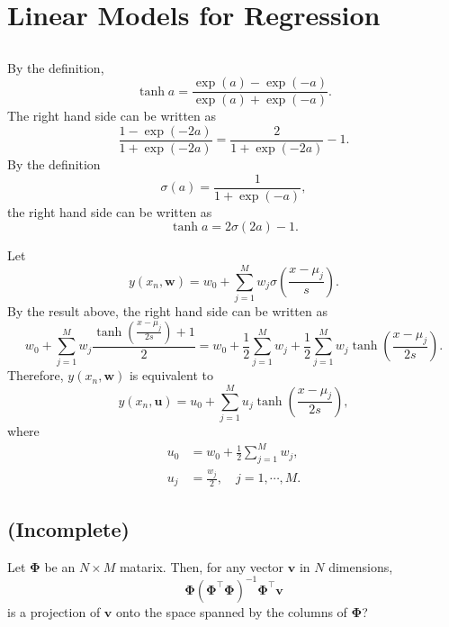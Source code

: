\section{Linear Models for Regression}


\subsection{}
\label{3.1}
By the definition,
%
\begin{equation}
\tanh a 
= 
\frac{\exp(a) - \exp(- a)}{\exp(a) + \exp(- a)}.
\end{equation}
%
The right hand side can be written as
%
\begin{equation}
\frac{1 - \exp(- 2 a)}{1 + \exp(- 2 a)}
=
\frac{2}{1 + \exp(- 2 a)}
-
1.
\end{equation}
%
By the definition
%
\begin{equation}
\sigma (a)
=
\frac{1}{1 + \exp(- a)},
\end{equation}
%
the right hand side can be written as
%
\begin{equation}
\tanh a
=
2
\sigma (2 a)
-
1.
\end{equation}
%

Let 
%
\begin{equation}
y(x_n, \mathbf{w})
=
w_0
+
\sum_{j = 1}^{M}
w_j
\sigma
\left(
	\frac{x - \mu_j}{s}
\right).
\end{equation}
%
By the result above, the right hand side can be written as
%
\begin{equation}
w_0
+
\sum_{j = 1}^{M}
w_j
\frac{\tanh (\frac{x - \mu_j}{2 s}) + 1}{2}
=
w_0
+
\frac{1}{2}
\sum_{j = 1}^{M}
w_j
+
\frac{1}{2}
\sum_{j = 1}^{M}
w_j
\tanh
\left(
	\frac{x - \mu_j}{2 s}
\right).
\end{equation}
%
Therefore, $y(x_n, \mathbf{w})$ is equivalent to
%
\begin{equation}
y(x_n, \mathbf{u})
=
u_0
+
\sum_{j = 1}^{M}
u_j
\tanh
\left(
	\frac{x - \mu_j}{2 s}
\right),
\end{equation}
%
where
%
\begin{equation}
\begin{aligned}
u_0
&=
w_0
+
\frac{1}{2}
\sum_{j = 1}^{M}
w_j, 
\\
u_j
&=
\frac{w_j}{2},
\quad
j
=
1, \cdots, M.
\end{aligned}
\end{equation}
%


\subsection{(Incomplete)}
\label{3.2}
Let $\bm{\Phi}$ be an $N \times M$ matarix.
Then, for any vector $\mathbf{v}$ in $N$ dimensions,
%
\begin{equation}
\bm{\Phi}
\left(
	\bm{\Phi} ^ \intercal
	\bm{\Phi}
\right) ^ {- 1}
\bm{\Phi} ^ \intercal
\mathbf{v}
\end{equation}
%
is a projection of $\mathbf{v}$ onto the space spanned by the columns of $\mathbf{\Phi}$?

